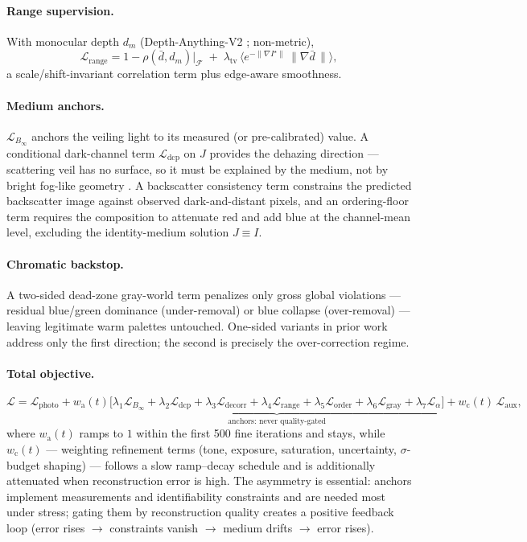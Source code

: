 \documentclass[11pt,a4paper]{article}
\newcommand{\Binf}{B_\infty}
\newcommand{\J}{J}
\newcommand{\I}{I}
\newcommand{\Lcal}{\mathcal{L}}
\begin{document}
\paragraph{Range supervision.}
With monocular depth $d_m$ (Depth-Anything-V2 \cite{yang2024depth}; non-metric),
\begin{equation}
    \Lcal_{\text{range}} = 1 - \rho(\bar d, d_m)\big|_{\mathcal{F}}
    \;+\;
    \lambda_{\text{tv}}\, \big\langle e^{-\|\nabla \I^\star\|}\,\|\nabla \bar d\,\| \big\rangle ,
\end{equation}
a scale/shift-invariant correlation term plus edge-aware smoothness.

\paragraph{Medium anchors.}
$\Lcal_{\Binf}$ anchors the veiling light to its measured (or pre-calibrated) value. A conditional dark-channel term $\Lcal_{\text{dcp}}$ on $\J$ provides the dehazing direction --- scattering veil has no surface, so it must be explained by the medium, not by bright fog-like geometry \cite{he2010single}. A backscatter consistency term constrains the predicted backscatter image against observed dark-and-distant pixels, and an ordering-floor term requires the composition to attenuate red and add blue at the channel-mean level, excluding the identity-medium solution $\J \equiv \I$.

\paragraph{Chromatic backstop.}
A two-sided dead-zone gray-world term penalizes only gross global violations --- residual blue/green dominance (under-removal) or blue collapse (over-removal) --- leaving legitimate warm palettes untouched. One-sided variants in prior work address only the first direction; the second is precisely the over-correction regime.

\paragraph{Total objective.}
\begin{equation}
    \Lcal
    =
    \Lcal_{\text{photo}}
    +
    w_{\text{a}}(t)
    \underbrace{\Big[
    \lambda_1 \Lcal_{\Binf} + \lambda_2 \Lcal_{\text{dcp}} + \lambda_3 \Lcal_{\text{decorr}} + \lambda_4 \Lcal_{\text{range}} + \lambda_5 \Lcal_{\text{order}} + \lambda_6 \Lcal_{\text{gray}} + \lambda_7 \Lcal_{\alpha}
    \Big]}_{\text{anchors: never quality-gated}}
    +
    w_{\text{c}}(t)\, \Lcal_{\text{aux}},
    \label{eq:total}
\end{equation}
where $w_{\text{a}}(t)$ ramps to $1$ within the first 500 fine iterations and stays, while $w_{\text{c}}(t)$ --- weighting refinement terms (tone, exposure, saturation, uncertainty, $\sigma$-budget shaping) --- follows a slow ramp--decay schedule and is additionally attenuated when reconstruction error is high. The asymmetry is essential: anchors implement measurements and identifiability constraints and are needed most under stress; gating them by reconstruction quality creates a positive feedback loop (error rises $\to$ constraints vanish $\to$ medium drifts $\to$ error rises).
\end{document}
